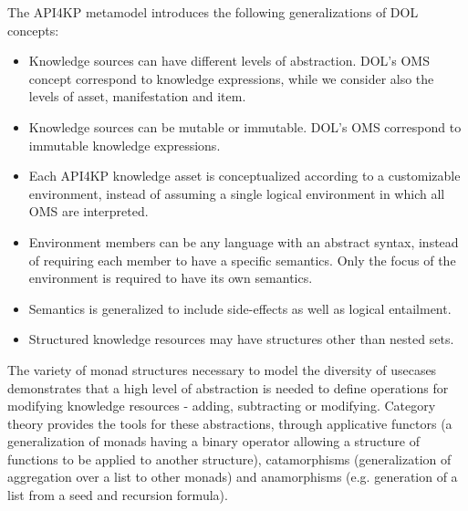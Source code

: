 \documentclass[runningheads]{llncs}
\begin{document}

The API4KP metamodel introduces the following generalizations of DOL concepts:
\begin{itemize}
\item Knowledge sources can have different levels of abstraction. DOL's OMS concept correspond to knowledge expressions, while we consider also the levels of asset, manifestation and item.
\item Knowledge sources can be mutable or immutable. DOL's OMS correspond to immutable knowledge expressions.
\item Each API4KP knowledge asset is conceptualized according to a customizable environment, instead of assuming a single logical environment in which all OMS are interpreted.
\item Environment members can be any language with an abstract syntax, instead of requiring each member to have a specific semantics. Only the focus of the environment is required to have its own semantics.
\item Semantics is generalized to include side-effects as well as logical entailment.
\item Structured knowledge resources may have structures other than nested sets.
\end{itemize}

The variety of monad structures necessary to model the diversity of usecases demonstrates that a high level of abstraction is needed to define operations for modifying knowledge resources - adding, subtracting or modifying. Category theory provides the tools for these abstractions, through applicative functors (a generalization of monads having a binary operator allowing a structure of functions to be applied to another structure), catamorphisms (generalization of aggregation over a list to other monads) and anamorphisms (e.g. generation of a list from a seed and recursion formula).

\vspace{-0.3cm}
\end{document}
